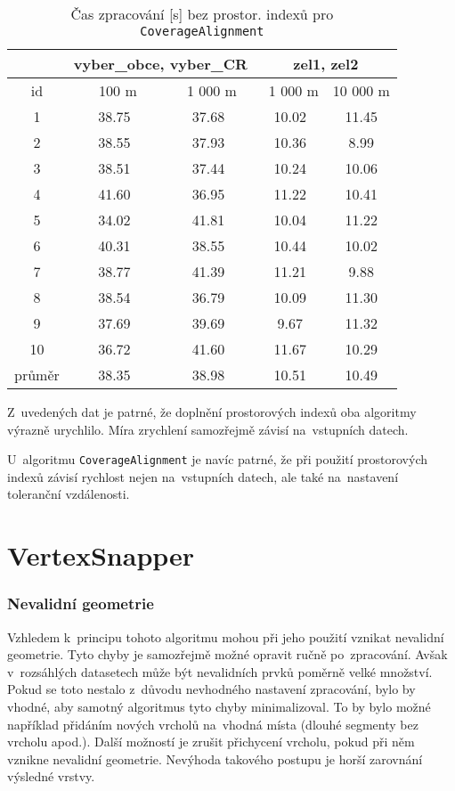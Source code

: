 \begin{table}
\centering
 \begin{tabular}{|c|c|c|c|c|}
  \hline
     & \multicolumn{2}{c|}{vyber\_obce, vyber\_CR} & 
	\multicolumn{2}{c|}{zel1, zel2} \\
  \hline
   id  &  ~~100 m~ & ~1 000 m & ~1 000 m & 10 000 m\\
  \hline
  \hline
1  & 38.75 & 37.68 & 10.02 & 11.45 \\ 
2  & 38.55 & 37.93 & 10.36 & 8.99  \\
3  & 38.51 & 37.44 & 10.24 & 10.06 \\
4  & 41.60 & 36.95 & 11.22 & 10.41 \\
5  & 34.02 & 41.81 & 10.04 & 11.22 \\
6  & 40.31 & 38.55 & 10.44 & 10.02 \\
7  & 38.77 & 41.39 & 11.21 & 9.88 \\
8  & 38.54 & 36.79 & 10.09 & 11.30 \\
9  & 37.69 & 39.69 & 9.67  & 11.32 \\
10 & 36.72 & 41.60 & 11.67 & 10.29 \\
  \hline
  \hline
  průměr & 38.35 & 38.98 & 10.51 & 10.49\\
  \hline
 \end{tabular}
  \caption{ Čas zpracování [s] bez prostor. indexů pro 
	    \texttt{Coverage\-Alignment}}
  \label{tab:ca-bez}
\end{table}

Z~uvedených dat je patrné, že doplnění prostorových indexů
oba algoritmy výrazně urychlilo. Míra zrychlení samozřejmě
závisí na~vstupních datech.

U~algoritmu \texttt{Coverage\-Alignment} je navíc patrné,
že při použití prostorových indexů závisí rychlost nejen
na~vstupních datech, ale také na~nastavení toleranční 
vzdálenosti. %

\section{VertexSnapper}
\label{problemy-vs}

\subsubsection{Nevalidní geometrie}
Vzhledem k~principu tohoto algoritmu mohou při jeho použití vznikat nevalidní 
geometrie. Tyto chyby je samozřejmě možné opravit ručně po~zpracování. Avšak
v~rozsáhlých datasetech může být nevalidních prvků poměrně velké množství.
Pokud se toto nestalo z~důvodu nevhodného nastavení zpracování, bylo by 
vhodné, aby samotný algoritmus tyto chyby minimalizoval. To by bylo možné 
například přidáním nových vrcholů na~vhodná místa (dlouhé segmenty bez vrcholu
apod.). Další možností je zrušit přichycení vrcholu, pokud při něm vznikne
nevalidní geometrie. Nevýhoda takového postupu je horší zarovnání výsledné 
vrstvy. 

